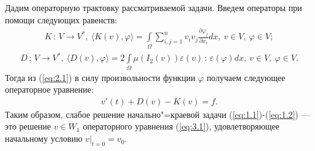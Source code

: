 \documentclass[14pt, a4paper]{extarticle}
\numberwithin{equation}{section}
\begin{document}
    Дадим операторную трактовку рассматриваемой задачи. Введем операторы при помощи следующих равенств:
    \begin{equation*}
        \begin{gathered}
            K\, : \,V \rightarrow V^*, \ \langle K(v), \varphi \rangle =
            \int\limits_\Omega \sum\limits_{i,j=1}^n v_i v_j \frac{\partial\varphi_j}{\partial x_i}dx, \
            v \in V, \ \varphi \in V;
        \end{gathered}
    \end{equation*}
    \begin{equation*}
        \begin{gathered}
            D\, : \,V \rightarrow V^*, \ \langle D(v), \varphi \rangle =
            2\int\limits_\Omega \mu(I_2(v))\varepsilon(v)\, : \,\varepsilon(\varphi)dx, \
            v \in V, \ \varphi \in V.
        \end{gathered}
    \end{equation*}
    Тогда из (\ref{eq:2.1}) в силу произвольности функции $\varphi$ получаем следующее операторное уравнение:
    \begin{equation}\label{eq:3.1}
        \begin{gathered}
            v'(t) + D(v) - K(v) = f.
        \end{gathered}
    \end{equation}
    Таким образом, слабое решение начально"=краевой задачи (\ref{eq:1.1})-(\ref{eq:1.2}) --- это решение $v \in W_1$
    операторного уравнения (\ref{eq:3.1}), удовлетворяющее начальному условию $v|_{t=0} = v_0$.
\end{document}
